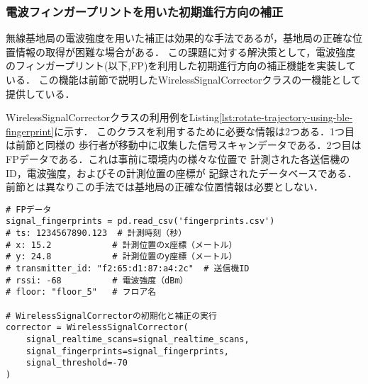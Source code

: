 
\subsubsection{電波フィンガープリントを用いた初期進行方向の補正}
無線基地局の電波強度を用いた補正は効果的な手法であるが，基地局の正確な位置情報の取得が困難な場合がある．
この課題に対する解決策として，電波強度のフィンガープリント(以下,FP)を利用した初期進行方向の補正機能を実装している．
この機能は前節で説明したWirelessSignalCorrectorクラスの一機能として提供している．

WirelessSignalCorrectorクラスの利用例をListing\ref{lst:rotate-trajectory-using-ble-fingerprint}に示す．
このクラスを利用するために必要な情報は2つある．1つ目は前節と同様の
歩行者が移動中に収集した信号スキャンデータである．2つ目は
FPデータである．これは事前に環境内の様々な位置で
計測された各送信機のID，電波強度，およびその計測位置の座標が
記録されたデータベースである．
前節とは異なりこの手法では基地局の正確な位置情報は必要としない．

\begin{lstlisting}[caption={WirelessSignalCorrectorの使用例},label=lst:rotate-trajectory-using-ble-fingerprint,float=ht]
# FPデータ
signal_fingerprints = pd.read_csv('fingerprints.csv')
# ts: 1234567890.123  # 計測時刻（秒）
# x: 15.2            # 計測位置のx座標（メートル）
# y: 24.8            # 計測位置のy座標（メートル）
# transmitter_id: "f2:65:d1:87:a4:2c"  # 送信機ID
# rssi: -68          # 電波強度（dBm）
# floor: "floor_5"   # フロア名

# WirelessSignalCorrectorの初期化と補正の実行
corrector = WirelessSignalCorrector(
    signal_realtime_scans=signal_realtime_scans,
    signal_fingerprints=signal_fingerprints,
    signal_threshold=-70
)
\end{lstlisting}



